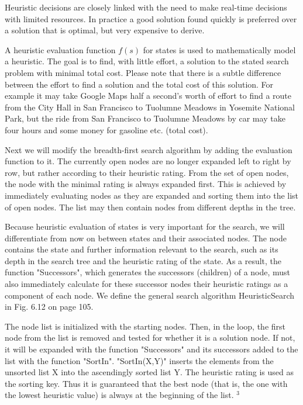 \documentclass[10pt]{book}
\begin{document}
\begin{center}
Heuristic decisions are closely linked with the need to make real-time decisions with limited resources. In practice a good solution found quickly is preferred over a solution that is optimal, but very expensive to derive.

A heuristic evaluation function $f(s)$ for states is used to mathematically model a heuristic. The goal is to find, with little effort, a solution to the stated search problem with minimal total cost. Please note that there is a subtle difference between the effort to find a solution and the total cost of this solution. For example it may take Google Maps half a second's worth of effort to find a route from the City Hall in San Francisco to Tuolumne Meadows in Yosemite National Park, but the ride from San Francisco to Tuolumne Meadows by car may take four hours and some money for gasoline etc. (total cost).

Next we will modify the breadth-first search algorithm by adding the evaluation function to it. The currently open nodes are no longer expanded left to right by row, but rather according to their heuristic rating. From the set of open nodes, the node with the minimal rating is always expanded first. This is achieved by immediately evaluating nodes as they are expanded and sorting them into the list of open nodes. The list may then contain nodes from different depths in the tree.

Because heuristic evaluation of states is very important for the search, we will differentiate from now on between states and their associated nodes. The node contains the state and further information relevant to the search, such as its depth in the search tree and the heuristic rating of the state. As a result, the function "Successors", which generates the successors (children) of a node, must also immediately calculate for these successor nodes their heuristic ratings as a component of each node. We define the general search algorithm HeuristicSearch in Fig. 6.12 on page 105.

The node list is initialized with the starting nodes. Then, in the loop, the first node from the list is removed and tested for whether it is a solution node. If not, it will be expanded with the function "Successors" and its successors added to the list with the function "SortIn". "SortIn(X,Y)" inserts the elements from the unsorted list X into the ascendingly sorted list Y. The heuristic rating is used as the sorting key. Thus it is guaranteed that the best node (that is, the one with the lowest heuristic value) is always at the beginning of the list. ${ }^{3}$


\end{center}
\end{document}
